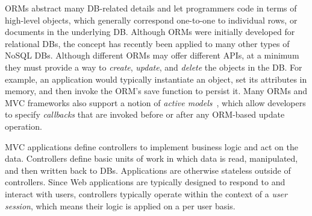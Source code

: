ORMs abstract many DB-related
details and let programmers code in terms of high-level objects, which
generally correspond one-to-one to individual rows, or documents
in the underlying DB.  Although
ORMs were initially developed for relational DBs, the concept has recently
been applied to many other types of NoSQL DBs.  
Although different ORMs may offer different APIs, at a minimum they must
provide a way to {\em create}, {\em update}, and {\em delete} the objects in
the DB.  For example, an application would typically instantiate an
object, set its attributes in memory, and then invoke the ORM's save
function to persist it.  Many ORMs and MVC frameworks also support a notion of 
{\em active models}~\cite{Fowler:2002:PEA:579257}, which allow
developers to specify {\em callbacks} that are invoked before or after
any ORM-based update operation.  

MVC applications define controllers to implement business logic and
act on the data.  Controllers define basic units of work in which data
is read, manipulated, and then written back to DBs.  Applications are
otherwise stateless outside of controllers.  Since Web applications
are typically designed to respond to and interact with users,
controllers typically operate within the context of a 
{\em user session}, which means their logic is applied on a per user
basis. 

